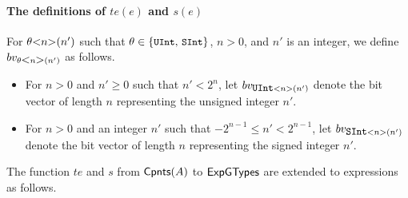 \paragraph*{The definitions of $te(e)$ and $s(e)$}
%
For $\theta \mbox{<} n \mbox{>}(n')$ such that $\theta \in \{\mbox{\prettyll{UInt}, \prettyll{SInt}}\}$, $n > 0$, and $n'$ is an integer, we define $bv_{\theta \mbox{<} n \mbox{>}(n')}$ as follows.
\begin{itemize}
\item For $n > 0$ and $n' \ge 0$ such that $n' < 2^n$, let $bv_{\mbox{\prettyll{UInt}}<n>(n')}$ denote the bit vector of length $n$ representing the unsigned integer $n'$.
%
\item For $n > 0$ and an integer $n'$ such that $-2^{n-1} \le n' < 2^{n-1}$, let $bv_{\mbox{\prettyll{SInt}}<n>(n')}$ denote the bit vector of length $n$ representing the signed integer $n'$.
\end{itemize}
The function $te$ and $s$ from ${\sf Cpnts}(A)$ to ${\sf ExpGTypes}$ are extended to expressions as follows.
